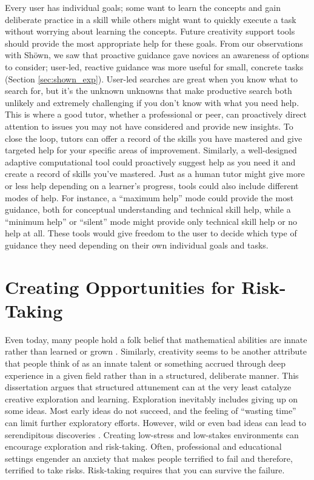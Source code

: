 Every user has individual goals; some want to learn the concepts and gain deliberate practice in a skill while others might want to quickly execute a task without worrying about learning the concepts. Future creativity support tools should provide the most appropriate help for these goals. From our observations with Sh{\"o}wn, we saw that proactive guidance gave novices an awareness of options to consider; user-led, reactive guidance was more useful for small, concrete tasks (Section \ref{sec:shown_exp}). User-led searches are great when you know what to search for, but it's the unknown unknowns that make productive search both unlikely and extremely challenging if you don't know with what you need help. This is where a good tutor, whether a professional or peer, can proactively direct attention to issues you may not have considered and provide new insights. To close the loop, tutors can offer a record of the skills you have mastered and give targeted help for your specific areas of improvement. Similarly, a well-designed adaptive computational tool could proactively suggest help as you need it and create a record of skills you've mastered. Just as a human tutor might give more or less help depending on a learner's progress, tools could also include different modes of help. For instance, a ``maximum help'' mode could provide the most guidance, both for conceptual understanding and technical skill help, while a ``minimum help'' or ``silent'' mode might provide only technical skill help or no help at all. These tools would give freedom to the user to decide which type of guidance they need depending on their own individual goals and tasks. 


\section{Creating Opportunities for Risk-Taking}
Even today, many people hold a folk belief that mathematical abilities are innate rather than learned or grown \cite{rattan2012s}. Similarly, creativity seems to be another attribute that people think of as an innate talent or something accrued through deep experience in a given field rather than in a structured, deliberate manner. This dissertation argues that structured attunement can at the very least catalyze creative exploration and learning. Exploration inevitably includes giving up on some ideas. Most early ideas do not succeed, and the feeling of ``wasting time'' can limit further exploratory efforts. However, wild or even bad ideas can lead to serendipitous discoveries \cite{osborn1953applied}. Creating low-stress and low-stakes environments can encourage exploration and risk-taking. Often, professional and educational settings engender an anxiety that makes people terrified to fail and therefore, terrified to take risks. Risk-taking requires that you can survive the failure. 

